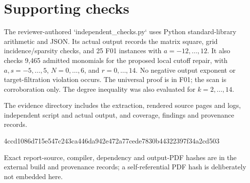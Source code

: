 \documentclass[10pt]{article}
\begin{document}
\section*{Supporting checks}
The reviewer-authored `independent\_checks.py` uses Python standard-library arithmetic and JSON. Its actual output records the matrix square, grid incidence/sparsity checks, and 25 F01 instances with \(a=-12,\ldots,12\). It also checks 9,465 admitted monomials for the proposed local cutoff repair, with \(a,s=-5,\ldots,5\), \(N=0,\ldots,6\), and \(r=0,\ldots,14\). No negative output exponent or target-filtration violation occurs. The universal proof is in F01; the scan is corroboration only. The degree inequality was also evaluated for \(k=2,\ldots,14\).\par
The evidence directory includes the extraction, rendered source pages and logs, independent script and actual output, and coverage, findings and provenance records.\par
4ccd1086d715e547c243ca446da942e472a77cede7830b44322397f34a2cd503\par
Exact report-source, compiler, dependency and output-PDF hashes are in the external build and provenance records; a self-referential PDF hash is deliberately not embedded here.\par
\end{document}
